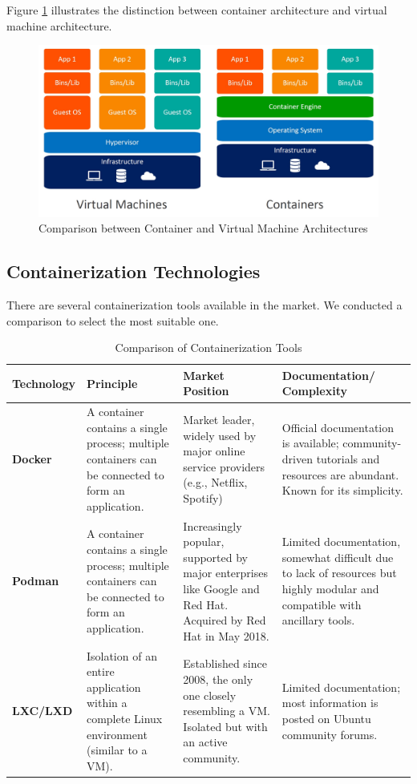 Figure \ref{fig:container_vs_vm} illustrates the distinction between container architecture and virtual machine architecture.

\begin{figure}[h]
    \centering
    \includegraphics[width=16cm]{Figures/containers-vs-vms.jpg}
    \caption{Comparison between Container and Virtual Machine Architectures}
    \label{fig:container_vs_vm}
\end{figure}

\subsection{Containerization Technologies}
There are several containerization tools available in the market. We conducted a comparison to select the most suitable one.

\begin{table}[h]
    \centering
    \begin{tabular}{|p{4cm}|p{4cm}|p{4cm}|p{4cm}|}
        \hline
        \textbf{Technology} & \textbf{Principle} & \textbf{Market Position} & \textbf{Documentation/ Complexity} \\
        \hline
        \textbf{Docker} & A container contains a single process; multiple containers can be connected to form an application. & Market leader, widely used by major online service providers (e.g., Netflix, Spotify) & Official documentation is available; community-driven tutorials and resources are abundant. Known for its simplicity.\\
        \hline
        \textbf{Podman} & A container contains a single process; multiple containers can be connected to form an application. & Increasingly popular, supported by major enterprises like Google and Red Hat. Acquired by Red Hat in May 2018. & Limited documentation, somewhat difficult due to lack of resources but highly modular and compatible with ancillary tools.\\
        \hline
        \textbf{LXC/LXD} & Isolation of an entire application within a complete Linux environment (similar to a VM). & Established since 2008, the only one closely resembling a VM. Isolated but with an active community. & Limited documentation; most information is posted on Ubuntu community forums. \\
        \hline
    \end{tabular}
    \caption{Comparison of Containerization Tools}
    \label{tab:container_tools_comparison}
\end{table}

